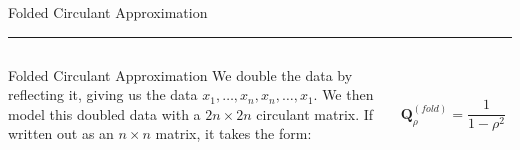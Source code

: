 \documentclass[
  ignorenonframetext,
]{beamer}
\begin{document}
\begin{frame}{Folded Circulant Approximation}
\begin{center}\rule{0.5\linewidth}{0.5pt}\end{center}

\begin{columns}[T]
\begin{column}{0.4\textwidth}
\begin{block}{Folded Circulant Approximation}
\label{folded-circulant-approximation-1}
We double the data by reflecting it, giving us the data
\(x_1,  \dots, x_n, x_n, \dots, x_1\). We then model this doubled data
with a \(2n \times 2n\) circulant matrix. If written out as an
\(n \times n\) matrix, it takes the form:
\end{block}
\end{column}

\begin{column}{0.6\textwidth}
\[
\mathbf{Q}_\rho^{(fold)} = \frac{1}{1-\rho^2}
\begin{bmatrix}
1-\rho+\rho^2 & -\rho & 0 & \cdots & 0 & 0 \\
-\rho & 1+\rho^2 & -\rho & \cdots & 0 & 0 \\
0 & -\rho & 1+\rho^2 & \cdots & 0 & 0 \\
\vdots & \vdots & \vdots & \ddots & \vdots & \vdots \\
0 & 0 & 0 & \cdots & -\rho & 1-\rho+\rho^2
\end{bmatrix}
\]
\end{column}
\end{columns}
\end{frame}
\end{document}
